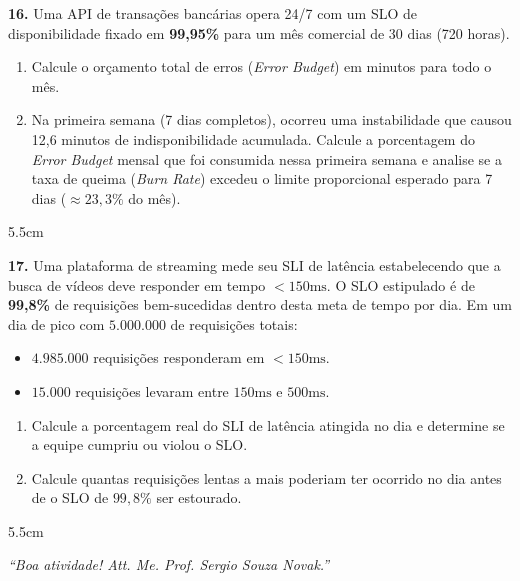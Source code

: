 \documentclass[12pt]{article}
\begin{document}
\vspace{0.4cm}

\textbf{16.} Uma API de transações bancárias opera 24/7 com um SLO de disponibilidade fixado em \textbf{99,95\%} para um mês comercial de 30 dias (720 horas).
\begin{enumerate}[label=\alph*)]
    \item Calcule o orçamento total de erros (\textit{Error Budget}) em minutos para todo o mês.
    \item Na primeira semana (7 dias completos), ocorreu uma instabilidade que causou 12,6 minutos de indisponibilidade acumulada. Calcule a porcentagem do \textit{Error Budget} mensal que foi consumida nessa primeira semana e analise se a taxa de queima (\textit{Burn Rate}) excedeu o limite proporcional esperado para 7 dias ($\approx 23,3\%$ do mês).
\end{enumerate}
\begin{resposta}{5.5cm}
\end{resposta}

\vspace{0.4cm}

\textbf{17.} Uma plataforma de streaming mede seu SLI de latência estabelecendo que a busca de vídeos deve responder em tempo $< 150\text{ms}$. O SLO estipulado é de \textbf{99,8\%} de requisições bem-sucedidas dentro desta meta de tempo por dia. Em um dia de pico com $5.000.000$ de requisições totais:
\begin{itemize}
    \item $4.985.000$ requisições responderam em $< 150\text{ms}$.
    \item $15.000$ requisições levaram entre $150\text{ms}$ e $500\text{ms}$.
\end{itemize}
\begin{enumerate}[label=\alph*)]
    \item Calcule a porcentagem real do SLI de latência atingida no dia e determine se a equipe cumpriu ou violou o SLO.
    \item Calcule quantas requisições lentas a mais poderiam ter ocorrido no dia antes de o SLO de $99,8\%$ ser estourado.
\end{enumerate}
\begin{resposta}{5.5cm}
\end{resposta}

\vspace{0.8cm}

\begin{center}
    \textit{“Boa atividade! Att. Me. Prof. Sergio Souza Novak.”}
\end{center}

\end{document}
